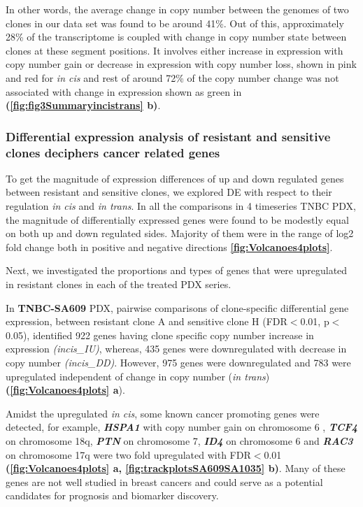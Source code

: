 In other words, the average change in copy number between the genomes of two clones in our data set was found to be around 41\%. Out of this, approximately 28\% of the transcriptome is coupled with change in copy number state between clones at these segment positions. It involves either increase in expression with copy number gain or decrease in expression with copy number loss, shown in pink and red for \textit{in cis} and rest of around 72\% of the copy number change was not associated with change in expression shown as green in \textbf{(\autoref{fig:fig3Summaryincistrans} b)}. 



\subsubsection{Differential expression analysis of resistant and sensitive clones deciphers cancer related genes}
 
 To get the magnitude of expression differences of up and down regulated genes between resistant and sensitive clones, we explored \ac{DE} with respect to their regulation \textit{in cis} and \textit{in trans}. In all the comparisons in 4 timeseries TNBC PDX, the magnitude of differentially expressed genes were found to be modestly equal on both up and down regulated sides. Majority of them were in the range of log2 fold change both in positive and negative directions \textbf{\autoref{fig:Volcanoes4plots}}.
 
 Next, we investigated the proportions and types of genes that were upregulated in resistant clones in each of the treated PDX series.
 
 In \textbf{TNBC-SA609} PDX, pairwise comparisons of clone-specific differential gene expression, between resistant clone A and sensitive clone H (FDR$<$0.01, p$<$0.05), identified 922 genes having clone specific copy number increase in expression \textit{(incis\_IU)}, whereas, 435 genes were downregulated with decrease in copy number \textit{(incis\_DD)}. However, 975 genes were downregulated and 783 were upregulated independent of change in copy number (\textit{in trans}) \textbf{(\autoref{fig:Volcanoes4plots} a}). 
 
Amidst the upregulated \textit{in cis}, some known cancer promoting genes were detected, for example, \textit{\textbf{HSPA1}} \cite{zoppino2018comprehensive} with copy number gain on chromosome 6 , \textit{\textbf{TCF4}} \cite{ravindranath2011wnt} on chromosome 18q, %
\textit{\textbf{PTN}} \cite{huang2018chemotherapy} on chromosome 7,        
\textit{\textbf{ID4}} \cite{donzelli2018expression} on chromosome 6 and  
\textit{\textbf{RAC3}} \cite{donnelly2017rac3} on chromosome 17q were two fold upregulated with FDR$<$0.01 \textbf{(\autoref{fig:Volcanoes4plots} a, \autoref{fig:trackplotsSA609SA1035} b)}. Many of these genes are not well studied in breast cancers and could serve as a potential candidates for prognosis and biomarker discovery.

